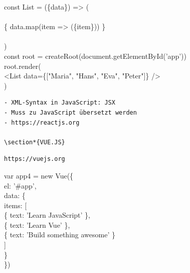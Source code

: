 \documentclass[10pt]{article}
\begin{document}
const List = (\{data\}) => (\\
\\
\{ data.map(item => (\{item\})) \}\\
\\
)\\
const root = createRoot(document.getElementById('app'))\\
root.render(\\[0pt]
<List data=\{["Maria", "Hans", "Eva", "Peter"]\} />\\
)

\begin{verbatim}
- XML-Syntax in JavaScript: JSX
- Muss zu JavaScript übersetzt werden
- https://reactjs.org

\section*{VUE.JS}
\end{verbatim}

\begin{verbatim}
https://vuejs.org
\end{verbatim}

var app4 = new Vue(\{\\
el: '\#app',\\
data: \{\\
items: [\\
\{ text: 'Learn JavaScript' \},\\
\{ text: 'Learn Vue' \},\\
\{ text: 'Build something awesome' \}\\[0pt]
]\\
\}\\
\})
\end{document}
